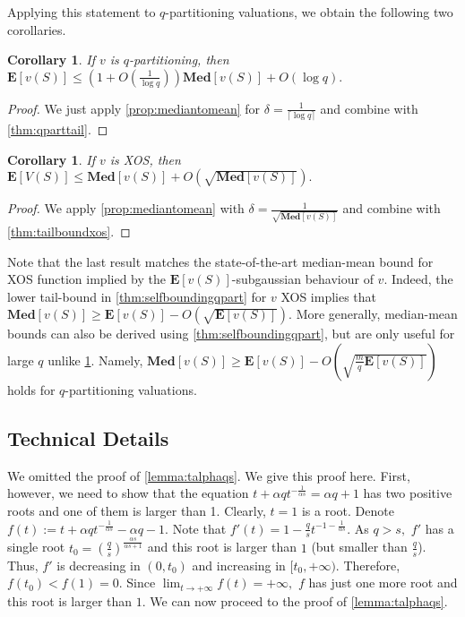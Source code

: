 \documentclass[11pt]{article}%
\newtheorem{corollary}[theorem]{Corollary}
\numberwithin{theorem}{subsection}
\newcommand{\median}{\mathbf{Med}}
\newcommand{\expect}{\mathbf{E}}
\begin{document}
\noindent
Applying this statement to $q$-partitioning valuations, we obtain the following two corollaries.

\begin{corollary}
\label{cor:medianmeanqpart}
If $v$ is $q$-partitioning, then 
$\expect[v(S)]\le (1 + O(\frac{1}{\log q}))\median[v(S)] + O(\log q).$
\end{corollary}
\begin{proof}
We just apply \cref{prop:mediantomean} for $\delta = \frac{1}{\lceil\log q\rceil}$ and combine with 
\cref{thm:qparttail}.
\end{proof}

\begin{corollary}
If $v$ is XOS, 
then $\expect[V(S)]\le \median[v(S)] + O(\sqrt{\median[v(S)]}).$
\end{corollary}
\begin{proof}
We apply \cref{prop:mediantomean} with $\delta = \frac{1}{\sqrt{\median[v(S)]}}$ and combine with 
\cref{thm:tailboundxos}.
\end{proof}

\noindent
Note that the last result matches the state-of-the-art median-mean bound for XOS function implied by the $\expect[v(S)]$-subgaussian behaviour of $v.$ Indeed, the lower tail-bound in \cref{thm:selfboundingqpart} for $v$ XOS
implies that $\median[v(S)]\ge \expect[v(S)] - 
O(\sqrt{\expect[v(S)]}).
$ More generally, median-mean bounds can also be derived using \cref{thm:selfboundingqpart}, but are only useful for large $q$ unlike \cref{cor:medianmeanqpart}. Namely,
 $\median[v(S)]\ge \expect[v(S)] - 
O(\sqrt{\frac{m}{q}\expect[v(S)]})
$ holds for $q$-partitioning valuations. 

\subsection{Technical Details}
\label{section:appendixtalphaqs}
We omitted the proof of \cref{lemma:talphaqs}. We give this proof here. First, however, we need to show that the equation $t + \alpha q t^{-\frac{1}{\alpha s}} = \alpha q + 1$ has two positive roots and one of them is larger than 1. Clearly, $t = 1$ is a root. Denote $f(t):= t + \alpha q t^{-\frac{1}{\alpha s}}-\alpha q - 1.$ Note that 
$f'(t) = 1 - \frac{q}{s}t^{-1-\frac{1}{\alpha s}}.$ As $q>s,$ $f'$ has a single root $t_0 = \left(\frac{q}{s}\right)^\frac{\alpha s}{\alpha s + 1}$ and this root is larger than $1$ (but smaller than $\frac{q}{s}$). Thus, $f'$ is decreasing in $(0,t_0) $ and increasing in $[t_0, +\infty).$ Therefore, $f(t_0)<f(1) = 0.$ Since $\lim_{t\longrightarrow+\infty} f(t) =+\infty,$ $f$ has just one more root and this root is larger than $1.$ We can now proceed to the proof of \cref{lemma:talphaqs}.
\end{document}
